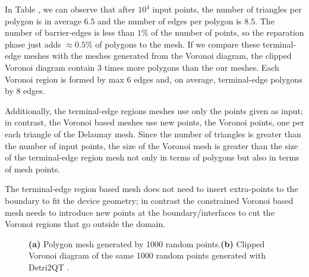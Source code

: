 In Table \label{table:results}, we can observe that after $10^4$ input points, the number of triangles per polygon is in average $6.5$ and the number of edges per polygon is $8.5$. The number of barrier-edges is less than $1\%$ of the number of points, so the reparation phase just adds $\approx 0.5\%$ of polygons to the mesh. If we compare these terminal-edge meshes with the meshes generated from the Voronoi diagram, the clipped Voronoi diagram contain 3 times more polygons than the our meshes. Each Voronoi region is formed by max 6 edges and, on average, terminal-edge polygons by 8 edges. 

Additionally, the terminal-edge regions meshes use only the points given as input; in contrast, the Voronoi based meshes use new points, the Voronoi points, one per each triangle of the Delaunay mesh. Since the number of triangles is greater than the number of input points, the size of the Voronoi mesh is greater than the size of the terminal-edge region mesh not only in terms of polygons but also in terms of mesh points.%

The terminal-edge region based mesh does not need to insert extra-points to the boundary to fit the device geometry; in contrast the constrained  Voronoi based mesh needs to introduce new points at the boundary/interfaces to cut the Voronoi regions that go outside the domain.  


\begin{figure}[!h]
\centering     %
{} \hspace{0.5cm}
\caption{\textbf{(a)} Polygon mesh generated by 1000 random points.\textbf{(b)} Clipped Voronoi diagram of the same 1000 random points generated with Detri2QT \cite{Detri2}. }
\label{figs:voro_comp} 
\end{figure}



